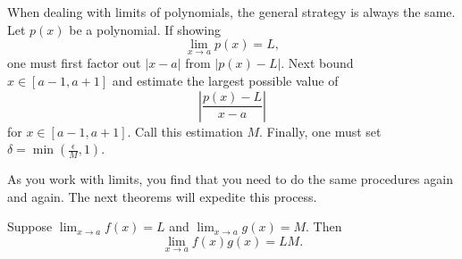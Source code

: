 When dealing with limits of polynomials, the general strategy is
always the same. Let $p(x)$ be a polynomial. If showing
\[
\lim_{x\to a} p(x) = L,
\]
one must first factor out $|x-a|$ from $|p(x) - L|$. Next bound $x\in
[a-1,a+1]$ and estimate the largest possible value of
\[
\left|\frac{p(x) -L}{x-a}\right|
\]
for $x\in[a-1,a+1]$. Call this estimation $M$. Finally, one must set
$\delta = \min\left(\frac{\epsilon}{M}, 1\right)$.

As you work with limits, you find that you need to do the same
procedures again and again. The next theorems will expedite this
process.
\begin{theorem}\label{theorem:limit-product} 
Suppose $\lim_{x\to a} f(x)=L$ and $\lim_{x\to a}g(x)=M$. Then
\[
\lim_{x\to a} f(x)g(x) = LM.
\]
\end{theorem}

